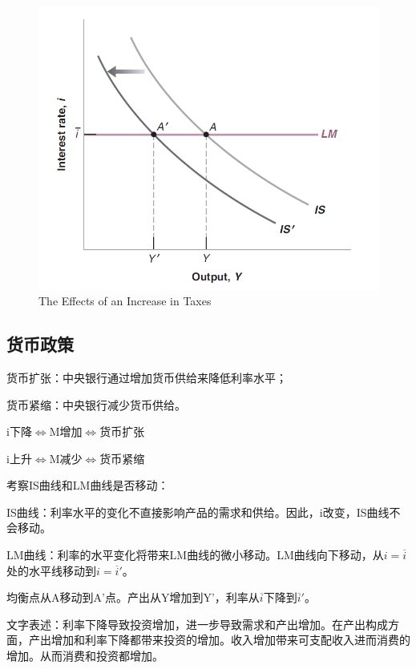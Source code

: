\documentclass{article}
\begin{document}
\begin{figure}[H] %
	\centering %
	\includegraphics[width=1\textwidth]{5_5} %
	\caption{The Effects of an Increase
		in Taxes} %
	\label{Fig.main6} %
\end{figure}

\subsection{货币政策}

货币扩张：中央银行通过增加货币供给来降低利率水平；

货币紧缩：中央银行减少货币供给。

i下降$\Leftrightarrow$M增加$\Leftrightarrow$货币扩张

i上升$\Leftrightarrow$M减少$\Leftrightarrow$货币紧缩

考察IS曲线和LM曲线是否移动：

IS曲线：利率水平的变化不直接影响产品的需求和供给。因此，i改变，IS曲线不会移动。

LM曲线：利率的水平变化将带来LM曲线的微小移动。LM曲线向下移动，从$ i=\overline{i} $处的水平线移动到$ i=\overline{i}' $。

均衡点从A移动到A'点。产出从Y增加到Y'，利率从$ \overline{i} $下降到$ \overline{i}' $。

文字表述：利率下降导致投资增加，进一步导致需求和产出增加。在产出构成方面，产出增加和利率下降都带来投资的增加。收入增加带来可支配收入进而消费的增加。从而消费和投资都增加。
\end{document}
